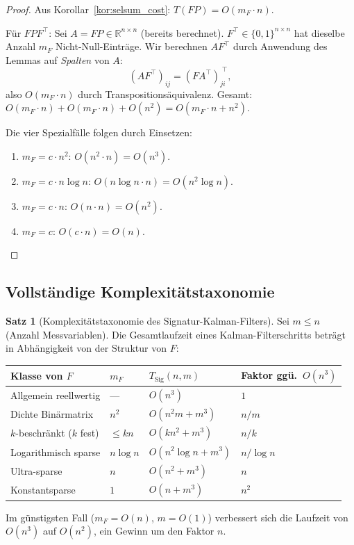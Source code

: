 ﻿\documentclass[a4paper,12pt]{article}
\theoremstyle{definition}
\newtheorem{satz}{Satz}
\begin{document}
\begin{proof}
Aus Korollar~\ref{kor:selsum_cost}: $T(FP) = O(m_F \cdot n)$.

Für $FPF^\top$: Sei $A = FP \in \mathbb{R}^{n\times n}$ (bereits berechnet).
$F^\top \in \{0,1\}^{n\times n}$ hat dieselbe Anzahl $m_F$ Nicht-Null-Einträge.
Wir berechnen $AF^\top$ durch Anwendung des Lemmas auf \emph{Spalten} von $A$:
\[
    (AF^\top)_{ij} = (F A^\top)_{ji}^{\;\top},
\]
also $O(m_F \cdot n)$ durch Transpositionsäquivalenz.
Gesamt: $O(m_F \cdot n) + O(m_F \cdot n) + O(n^2) = O(m_F \cdot n + n^2)$.

Die vier Spezialfälle folgen durch Einsetzen:
\begin{enumerate}
    \item $m_F = c \cdot n^2$: $O(n^2 \cdot n) = O(n^3)$.
    \item $m_F = c \cdot n\log n$: $O(n\log n \cdot n) = O(n^2 \log n)$.
    \item $m_F = c \cdot n$: $O(n \cdot n) = O(n^2)$.
    \item $m_F = c$: $O(c \cdot n) = O(n)$.
\end{enumerate}
\end{proof}

\subsection{Vollständige Komplexitätstaxonomie}

\begin{satz}[Komplexitätstaxonomie des Signatur-Kalman-Filters]
\label{satz:taxonomie}
    Sei $m \leq n$ (Anzahl Messvariablen). Die Gesamtlaufzeit eines
    Kalman-Filterschritts beträgt in Abhängigkeit von der Struktur von $F$:

    \begin{center}
    \begin{tabular}{llll}
    \toprule
    Klasse von $F$ & $m_F$ & $T_{\mathrm{Sig}}(n,m)$ & Faktor ggü.\ $O(n^3)$ \\
    \midrule
    Allgemein reellwertig & --- & $O(n^3)$ & $1$ \\
    Dichte Binärmatrix & $n^2$ & $O(n^2 m + m^3)$ & $n/m$ \\
    $k$-beschränkt ($k$ fest) & $\leq kn$ & $O(k n^2 + m^3)$ & $n/k$ \\
    Logarithmisch sparse & $n \log n$ & $O(n^2 \log n + m^3)$ & $n/\log n$ \\
    Ultra-sparse & $n$ & $O(n^2 + m^3)$ & $n$ \\
    Konstantsparse & $1$ & $O(n + m^3)$ & $n^2$ \\
    \bottomrule
    \end{tabular}
    \end{center}
    Im günstigsten Fall ($m_F = O(n)$, $m = O(1)$) verbessert sich die
    Laufzeit von $O(n^3)$ auf $O(n^2)$, ein Gewinn um den Faktor $n$.
\end{satz}
\end{document}
